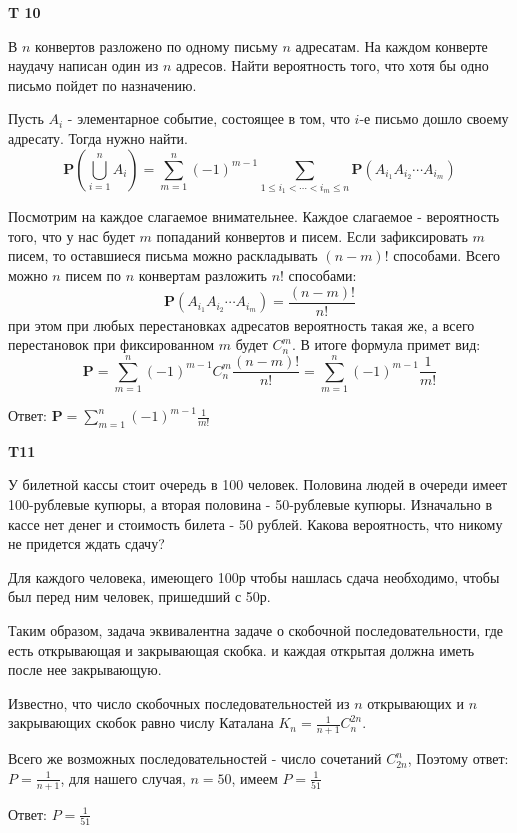 \documentclass[a4paper,12pt]{article} %
\begin{document}
\begin{example}\textbf{T 10}

В $n$ конвертов разложено по одному письму $n$ адресатам. 
На каждом конверте наудачу написан один из $n$ адресов. 
Найти вероятность того, что хотя бы одно письмо пойдет по назначению.

Пусть $ A_i$ - элементарное событие, состоящее в том, что $i$-е письмо дошло своему адресату. Тогда нужно найти.
\[ \mathbf{P}(\bigcup_{i=1}^n A_i)= \sum_{m=1}^{n}(-1)^{m-1} \sum_{1 \leqslant i_{1}<\cdots<i_{m} \leqslant n}
\mathbf{P}\left(A_{i_{1}} A_{i_{2}} \cdots A_{i_{m}}\right) \]

Посмотрим на каждое слагаемое внимательнее. Каждое слагаемое - вероятность того, что у нас будет $m$ попаданий конвертов и писем.
Если зафиксировать $m$ писем, то оставшиеся письма можно раскладывать $(n-m)!$ способами. 
Всего можно $n$ писем по $n$ конвертам разложить $ n!$ способами:
\[ \mathbf{P}\left(A_{i_{1}} A_{i_{2}}\cdots A_{i_{m}}\right)=\frac{(n-m)!}{n!} \]
при этом при любых перестановках адресатов вероятность такая же, а всего перестановок при фиксированном $m$ будет $ C_n^m$.
В итоге формула примет вид:
\[ \mathbf{P}=\sum_{m=1}^{n}(-1)^{m-1} C_n^m \frac{(n-m)!}{n!}=
\sum_{m=1}^{n}(-1)^{m-1}\frac{1}{m!} \]

Ответ: $\mathbf{P}= \sum_{m=1}^{n}(-1)^{m-1}\frac{1}{m!} $

\end{example}






\begin{example}\textbf{T11}

У билетной кассы стоит очередь в 100 человек. Половина людей в очереди имеет 100-рублевые купюры, а вторая половина - 50-рублевые купюры. 
Изначально в кассе нет денег и стоимость билета - 50 рублей. 
Какова вероятность, что никому не придется ждать сдачу?

Для каждого человека, имеющего 100р чтобы нашлась сдача необходимо, чтобы был перед ним человек, пришедший с 50р.


Таким образом, задача эквивалентна задаче о скобочной последовательности, где есть открывающая и закрывающая скобка. и каждая открытая должна иметь после нее закрывающую.


Известно, что число скобочных последовательностей из $ n$ открывающих и $ n$ закрывающих скобок равно числу Каталана $K_n = \frac{1}{n+1}C_n^{2n}$.

Всего же возможных последовательностей - число сочетаний $ C_{2n}^n$, Поэтому ответ: $P= \frac{1}{n+1}$, для нашего случая, $ n=50$, имеем $P= \frac{1}{51}$


Ответ: $P= \frac{1}{51}$


\end{example}
\end{document}
